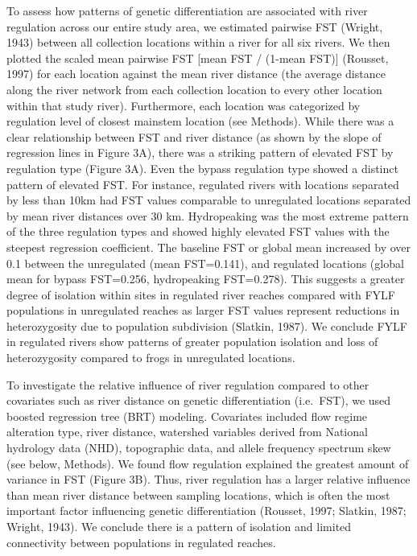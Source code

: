\documentclass[twoside,12pt,final]{ucthesis-CA2012}
\begin{document}
\begin{ucmainmatter}
To assess how patterns of genetic differentiation are associated with
river regulation across our entire study area, we estimated pairwise FST
(Wright, 1943) between all collection locations within a river for all
six rivers. We then plotted the scaled mean pairwise FST {[}mean FST /
(1-mean FST){]} (Rousset, 1997) for each location against the mean river
distance (the average distance along the river network from each
collection location to every other location within that study river).
Furthermore, each location was categorized by regulation level of
closest mainstem location (see Methods). While there was a clear
relationship between FST and river distance (as shown by the slope of
regression lines in Figure 3A), there was a striking pattern of elevated
FST by regulation type (Figure 3A). Even the bypass regulation type
showed a distinct pattern of elevated FST. For instance, regulated
rivers with locations separated by less than 10km had FST values
comparable to unregulated locations separated by mean river distances
over 30 km. Hydropeaking was the most extreme pattern of the three
regulation types and showed highly elevated FST values with the steepest
regression coefficient. The baseline FST or global mean increased by
over 0.1 between the unregulated (mean FST=0.141), and regulated
locations (global mean for bypass FST=0.256, hydropeaking FST=0.278).
This suggests a greater degree of isolation within sites in regulated
river reaches compared with FYLF populations in unregulated reaches as
larger FST values represent reductions in heterozygosity due to
population subdivision (Slatkin, 1987). We conclude FYLF in regulated
rivers show patterns of greater population isolation and loss of
heterozygosity compared to frogs in unregulated locations.

To investigate the relative influence of river regulation compared to
other covariates such as river distance on genetic differentiation
(i.e.~FST), we used boosted regression tree (BRT) modeling. Covariates
included flow regime alteration type, river distance, watershed
variables derived from National hydrology data (NHD), topographic data,
and allele frequency spectrum skew (see below, Methods). We found flow
regulation explained the greatest amount of variance in FST (Figure 3B).
Thus, river regulation has a larger relative influence than mean river
distance between sampling locations, which is often the most important
factor influencing genetic differentiation (Rousset, 1997; Slatkin,
1987; Wright, 1943). We conclude there is a pattern of isolation and
limited connectivity between populations in regulated reaches.


\end{ucmainmatter}
\end{document}

